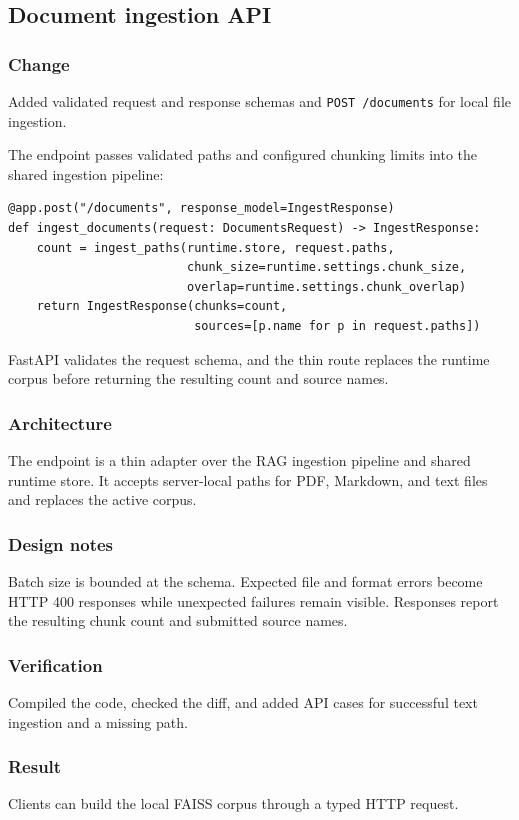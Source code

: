 
\subsection{Document ingestion API}


\subsubsection{Change}

Added validated request and response schemas and \texttt{POST\ /documents} for local file ingestion.

The endpoint passes validated paths and configured chunking limits into the shared ingestion pipeline:

\begin{verbatim}
@app.post("/documents", response_model=IngestResponse)
def ingest_documents(request: DocumentsRequest) -> IngestResponse:
    count = ingest_paths(runtime.store, request.paths,
                         chunk_size=runtime.settings.chunk_size,
                         overlap=runtime.settings.chunk_overlap)
    return IngestResponse(chunks=count,
                          sources=[p.name for p in request.paths])
\end{verbatim}

FastAPI validates the request schema, and the thin route replaces the runtime corpus before returning the resulting count and source names.

\subsubsection{Architecture}

The endpoint is a thin adapter over the RAG ingestion pipeline and shared runtime store. It accepts server-local paths for PDF, Markdown, and text files and replaces the active corpus.

\subsubsection{Design notes}

Batch size is bounded at the schema. Expected file and format errors become HTTP 400 responses while unexpected failures remain visible. Responses report the resulting chunk count and submitted source names.

\subsubsection{Verification}

Compiled the code, checked the diff, and added API cases for successful text ingestion and a missing path.

\subsubsection{Result}

Clients can build the local FAISS corpus through a typed HTTP request.

